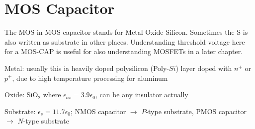 \chapter{MOS Capacitor}
The MOS in MOS capacitor stands for Metal-Oxide-Silicon. Sometimes the S is also written as substrate in other places. Understanding threshold voltage here for a MOS-CAP is useful for also understanding MOSFETs in a later chapter.
\begin{pline}
    \item Metal: usually this ia  heavily doped polysilicon (Poly-$Si$) layer doped with $n^+$ or $p^+$, due to high temperature processing for aluminum
    \item Oxide: SiO$_2$ where $\epsilon_{ox} = 3.9 \epsilon_0$, can be any insulator actually
    \item Substrate: $\epsilon_s = 11.7 \epsilon_0$; NMOS capacitor $\rightarrow$ $P$-type substrate, PMOS capacitor $\rightarrow$ $N$-type substrate
\end{pline}

